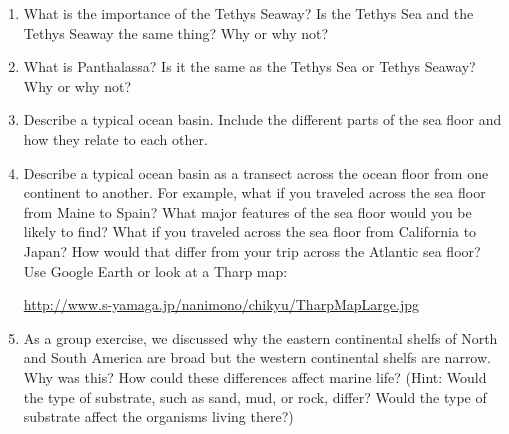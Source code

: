 \documentclass[letterpaper]{tufte-handout}
\begin{document}
\begin{enumerate}
\item What is the importance of the Tethys Seaway?  Is the Tethys Sea and the Tethys Seaway the same thing? Why or why not?

\item What is Panthalassa? Is it the same as the Tethys Sea or Tethys Seaway?  Why or why not?

\item Describe a typical ocean basin.  Include the different parts of the sea floor and how they relate to each other.   

\item Describe a typical ocean basin as a transect across the ocean floor from one continent to another.  For example, what if you traveled across the sea floor from Maine to Spain?  What major features of the sea floor would you be likely to find?  What if you traveled across the sea floor from California to Japan? How would that differ from your trip across the Atlantic sea floor?  Use Google Earth or look at a Tharp map: 

\url{http://www.s-yamaga.jp/nanimono/chikyu/TharpMapLarge.jpg}

\item As a group exercise, we discussed why the eastern continental shelfs of North and South America are broad but the western continental shelfs are narrow.  Why was this?  How could these differences affect marine life? (Hint: Would the type of substrate, such as sand, mud, or rock, differ?  Would the type of substrate affect the organisms living there?)  

\end{enumerate}
\end{document}
